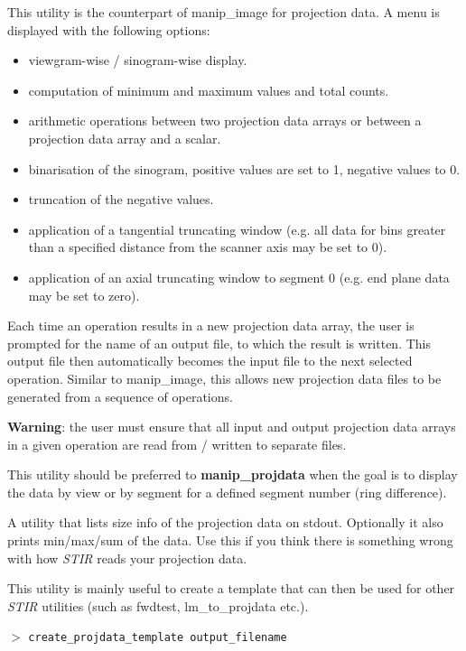 \documentclass{article}
\newcommand{\cmdline}[1]{\par \noindent $>$ \texttt{#1}\par}
\begin{document}
{ 
}

This utility is the counterpart of manip\_image for projection 
data. A menu is displayed with the following options:

\begin{itemize}
\item viewgram-wise / sinogram-wise display.
\item computation of minimum and maximum values and total counts.
\item arithmetic operations between two projection data arrays or 
between a projection data array and a scalar.
\item binarisation of the sinogram, positive values are set to 1, 
negative values to 0.
\item truncation of the negative values.
\item application of a tangential truncating window (e.g. all data 
for bins greater than a specified distance from the scanner axis 
may be set to 0).
\item application of an axial truncating window to segment 0 (e.g. 
end plane data may be set to zero).
\end{itemize}
Each time an operation results in a new projection data array, 
the user is prompted for the name of an output file, to which 
the result is written. This output file then automatically becomes 
the input file to the next selected operation. Similar to manip\_image, 
this allows new projection data files to be generated from a 
sequence of operations.


\textbf{Warning}: the user must ensure that all input and output projection 
data arrays in a given operation are read from / written to separate 
files.

{ 
}

This utility should be preferred to \textbf{manip\_projdata} when the 
goal is to display the data by view or by segment for a defined 
segment number (ring difference).

{ 
}

A utility that lists size info of the projection data on stdout. Optionally
it also prints min/max/sum of the data. 
Use this if you think there is something wrong with how \textit{STIR} 
reads your projection data.

{ 
}

This utility is mainly useful to create a template that can then 
be used for other \textit{STIR} utilities (such as fwdtest, lm\_to\_projdata 
etc.).
\cmdline{create\_projdata\_template output\_filename}
\end{document}
